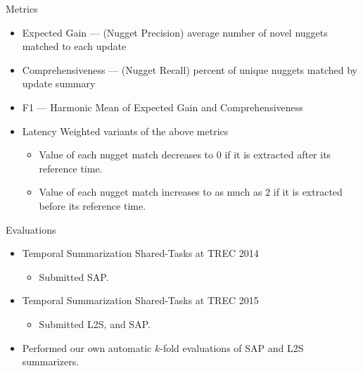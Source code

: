 \begin{frame}{Metrics}
\begin{itemize}
\item Expected Gain  --- (Nugget Precision) 
 average number of novel nuggets matched to each update

\vspace{10pt}
\item Comprehensiveness --- (Nugget Recall) percent of unique nuggets matched
by update summary
\vspace{10pt}
\item F1 --- Harmonic Mean of Expected Gain and Comprehensiveness

\vspace{10pt}
\item Latency Weighted variants of the above metrics
\begin{itemize}
\item Value of each nugget match decreases to 0 if it is extracted after its reference time.
\item Value of each nugget match increases to as much as 2 if it is 
extracted before its reference time.
\end{itemize}

\end{itemize}


\end{frame}


\begin{frame}{Evaluations}

\begin{itemize}
\item Temporal Summarization Shared-Tasks at TREC 2014 
\begin{itemize}
\item Submitted SAP.
\end{itemize}
\item Temporal Summarization Shared-Tasks at TREC 2015
\begin{itemize}
\item Submitted L2S, and SAP.
\end{itemize}
\vspace{10pt}
\item Performed our own automatic $k$-fold evaluations of SAP and L2S summarizers. 
\end{itemize}
\end{frame}

